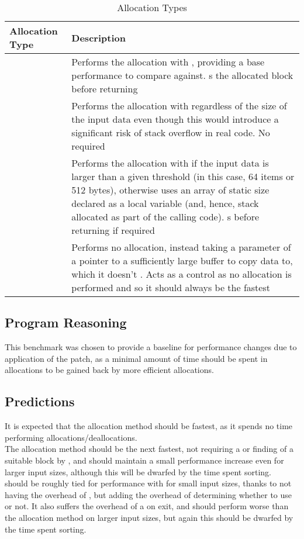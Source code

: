 \begin{table}
	\centering
	\begin{tabularx}{\linewidth}{>{\hsize=0.6\hsize}X >{\hsize=1.4\hsize}X}
		\toprule
		\textbf{Allocation Type} & \textbf{Description} \\
		\midrule
		\functionname{malloc} & Performs the allocation with \malloc{}, providing a base performance to compare against. \free{}s the allocated block before returning \\
		\functionname{stack} & Performs the allocation with \functionname{alloca} regardless of the size of the input data even though this would introduce a significant risk of stack overflow in real code. No \free{} required \\
		\functionname{dynamic} & Performs the allocation with \malloc{} if the input data is larger than a given threshold (in this case, 64 items or 512 bytes), otherwise uses an array of static size declared as a local variable (and, hence, stack allocated as part of the calling code). \free{}s before returning if required \\
		\functionname{external} & Performs no allocation, instead taking a parameter of a pointer to a sufficiently large buffer to copy data to, which it doesn't \free{}. Acts as a control as no allocation is performed and so it should always be the fastest \\
		\bottomrule
	\end{tabularx}
	\caption{Allocation Types}\label{alloctype}
\end{table}

\subsection{Program Reasoning}

This benchmark was chosen to provide a baseline for performance changes due to application of the patch, as a minimal amount of time should be spent in allocations to be gained back by more efficient allocations.

\subsection{Predictions}

It is expected that the  allocation method should be fastest, as it spends no time performing allocations/deallocations. \\
The  allocation method should be the next fastest, not requiring a \free{} or finding of a suitable block by \malloc{}, and should maintain a small performance increase even for larger input sizes, although this will be dwarfed by the time spent sorting. \\
 should be roughly tied for performance with  for small input sizes, thanks to not having the overhead of , but adding the overhead of determining whether to use \malloc{} or not. It also suffers the overhead of a \free{} on exit, and should perform worse than the  allocation method on larger input sizes, but again this should be dwarfed by the time spent sorting.

